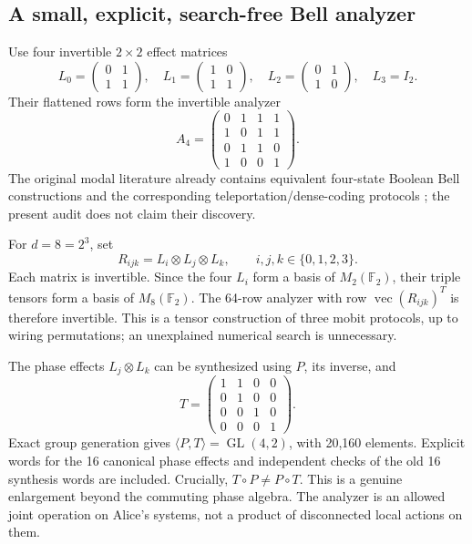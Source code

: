 \documentclass[11pt,a4paper]{article}
\theoremstyle{definition}\newtheorem{definition}[theorem]{Definition}
\newcommand{\F}{\mathbb F_2}
\newcommand{\GL}{\operatorname{GL}}
\newcommand{\vecop}{\operatorname{vec}}
\begin{document}
\subsection{A small, explicit, search-free Bell analyzer}
Use four invertible $2\times2$ effect matrices
\begin{equation}
 L_0=\begin{pmatrix}0&1\\1&1\end{pmatrix},\quad
 L_1=\begin{pmatrix}1&0\\1&1\end{pmatrix},\quad
 L_2=\begin{pmatrix}0&1\\1&0\end{pmatrix},\quad
 L_3=I_2.
 \label{eq:L}
\end{equation}
Their flattened rows form the invertible analyzer
\begin{equation}
 A_4=\begin{pmatrix}0&1&1&1\\1&0&1&1\\0&1&1&0\\1&0&0&1\end{pmatrix}.
\end{equation}
The original modal literature already contains equivalent four-state Boolean Bell constructions and the corresponding teleportation/dense-coding protocols \cite{schumacher2011}; the present audit does not claim their discovery.

For $d=8=2^3$, set
\begin{equation}
 R_{ijk}=L_i\otimes L_j\otimes L_k,\qquad i,j,k\in\{0,1,2,3\}.
 \label{eq:64basis}
\end{equation}
Each matrix is invertible. Since the four $L_i$ form a basis of $M_2(\F)$, their triple tensors form a basis of $M_8(\F)$. The 64-row analyzer with row $\vecop(R_{ijk})^T$ is therefore invertible. This is a tensor construction of three mobit protocols, up to wiring permutations; an unexplained numerical search is unnecessary.

The phase effects $L_j\otimes L_k$ can be synthesized using $P$, its inverse, and
\[
 T=\begin{pmatrix}1&1&0&0\\0&1&0&0\\0&0&1&0\\0&0&0&1\end{pmatrix}.
\]
Exact group generation gives $\langle P,T\rangle=\GL(4,2)$, with 20,160 elements. Explicit words for the 16 canonical phase effects and independent checks of the old 16 synthesis words are included. Crucially, $T\circ P\ne P\circ T$. This is a genuine enlargement beyond the commuting phase algebra. The analyzer is an allowed joint operation on Alice's systems, not a product of disconnected local actions on them.
\end{document}
